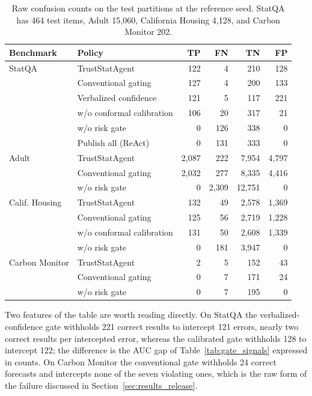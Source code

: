\documentclass[preprint,12pt,authoryear]{elsarticle}
\begin{document}
\begin{table}[H]
    \centering
    \caption{Raw confusion counts on the test partitions at the reference seed. StatQA has 464 test items, Adult 15{,}060, California Housing 4{,}128, and Carbon Monitor 202.}
    \label{tab:raw_counts}
    \footnotesize
    \setlength{\tabcolsep}{7pt}
    \renewcommand{\arraystretch}{1.12}
    \begin{tabular}{@{}llrrrr@{}}
        \toprule
        \textbf{Benchmark} & \textbf{Policy} & \textbf{TP} & \textbf{FN} & \textbf{TN} & \textbf{FP} \\
        \midrule
        StatQA & TrustStatAgent & 122 & 4 & 210 & 128 \\
               & Conventional gating & 127 & 4 & 200 & 133 \\
               & Verbalized confidence & 121 & 5 & 117 & 221 \\
               & w/o conformal calibration & 106 & 20 & 317 & 21 \\
               & w/o risk gate & 0 & 126 & 338 & 0 \\
               & Publish all (ReAct) & 0 & 131 & 333 & 0 \\
        \midrule
        Adult & TrustStatAgent & 2{,}087 & 222 & 7{,}954 & 4{,}797 \\
              & Conventional gating & 2{,}032 & 277 & 8{,}335 & 4{,}416 \\
              & w/o risk gate & 0 & 2{,}309 & 12{,}751 & 0 \\
        \midrule
        Calif. Housing & TrustStatAgent & 132 & 49 & 2{,}578 & 1{,}369 \\
              & Conventional gating & 125 & 56 & 2{,}719 & 1{,}228 \\
              & w/o conformal calibration & 131 & 50 & 2{,}608 & 1{,}339 \\
              & w/o risk gate & 0 & 181 & 3{,}947 & 0 \\
        \midrule
        Carbon Monitor & TrustStatAgent & 2 & 5 & 152 & 43 \\
              & Conventional gating & 0 & 7 & 171 & 24 \\
              & w/o risk gate & 0 & 7 & 195 & 0 \\
        \bottomrule
    \end{tabular}
\end{table}

Two features of the table are worth reading directly.
On StatQA the verbalized-confidence gate withholds 221 correct results to intercept 121 errors, nearly two correct results per intercepted error, whereas the calibrated gate withholds 128 to intercept 122; the difference is the AUC gap of Table~\ref{tab:gate_signals} expressed in counts.
On Carbon Monitor the conventional gate withholds 24 correct forecasts and intercepts none of the seven violating ones, which is the raw form of the failure discussed in Section~\ref{sec:results_release}.
\end{document}
